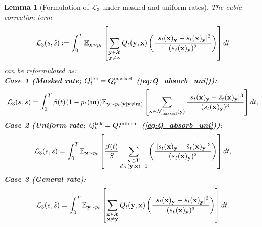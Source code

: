 \documentclass{article} %
\newtheorem{lemma}[theorem]{Lemma}
\def\eqref#1{equation~\ref{#1}}
\newcommand{\bfx}{{\bf x}}
\newcommand{\bfy}{ {\bf y}}
\newcommand{\bfm}{{\bf m}}
\renewcommand{\eqref}[1]{\textup{(\ref{#1})}}
\newcommand{\LThree}{\mathcal{L}_{3}}
\newcommand{\Nmasked}{\mathcal{N}^{\leftarrow}_{\text{masked}}}
\begin{document}
\begin{lemma}[Formulation of $\LThree$ under masked and uniform rates]\label{lemma:L3_formulate}
    The cubic correction term
    \begin{equation*}
        \LThree(s, \tilde{s}) := \int_0^T \mathbb{E}_{\bfx \sim p_t} \left[ \sum_{\substack{\bfy\in\mathcal{X} \\ \bfy\neq \bfx}}  Q_t(\bfy, \bfx) \left( \frac{\,|s_t(\bfx)_\bfy - \tilde{s}_t(\bfx)_\bfy|^3}{(s_t(\bfx)_\bfy)^2} \right) \right]  dt
    \end{equation*}
    can be reformulated as: \\
    \textbf{Case 1 (Masked rate; $Q^{\mathrm{tok}}_t=Q_t^{\rm masked}$ \eqref{eq:Q_absorb_uni}):}
    \begin{equation}
        \LThree(s, \tilde{s}) = \int_0^T \beta(t) (1-p_t(\bfm)) \mathbb{E}_{\bfy \sim p_t(\bfy|\bfy \neq \bfm)} \left[ \sum_{\substack{\substack{\bfx \in \Nmasked(\bfy)}}} \frac{\,|s_t(\bfx)_\bfy - \tilde{s}_t(\bfx)_\bfy|^3}{ (s_t(\bfx)_\bfy)^3} \right] dt,
    \end{equation}
    \textbf{Case 2 (Uniform rate; $Q^{\mathrm{tok}}_t=Q_t^{\rm uniform}$ \eqref{eq:Q_absorb_uni}):} 
    \begin{equation}
        \LThree(s, \tilde{s}) = \int_0^T \mathbb{E}_{\bfx \sim p_t} \left[ \frac{\beta(t)}{S} \sum_{\substack{\bfy \in\mathcal{X} \\ d_H(\bfy,\bfx)=1}}   \left( \frac{\,|s_t(\bfx)_\bfy - \tilde{s}_t(\bfx)_\bfy|^3}{(s_t(\bfx)_\bfy)^2} \right) \right]  dt,
    \end{equation}
    \textbf{Case 3 (General rate):}
    \begin{equation}
        \LThree(s, \tilde{s}) = \int_0^T \mathbb{E}_{\bfy \sim p_t} \left[ \sum_{\substack{\bfx\in\mathcal{X} \\ \bfx\neq \bfy}}  Q_t(\bfy, \bfx)  \left( \frac{\,|s_t(\bfx)_\bfy - \tilde{s}_t(\bfx)_\bfy|^3}{ (s_t(\bfx)_\bfy)^3} \right) \right] dt.
    \end{equation}
\end{lemma}
\end{document}
